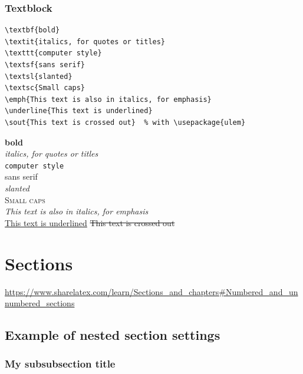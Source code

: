 \documentclass{article}
\begin{document}
\subsubsection{Textblock}
\begin{minipage}[t]{0.5\textwidth}
\begin{lstlisting}
\textbf{bold}
\textit{italics, for quotes or titles}
\texttt{computer style}
\textsf{sans serif}
\textsl{slanted}
\textsc{Small caps}
\emph{This text is also in italics, for emphasis}
\underline{This text is underlined}
\sout{This text is crossed out}  % with \usepackage{ulem}
\end{lstlisting}
\end{minipage}
\begin{minipage}[t]{0.5\textwidth}
\textbf{bold}\\
\textit{italics, for quotes or titles}\\
\texttt{computer style}\\
\textsf{sans serif}\\
\textsl{slanted}\\
\textsc{Small caps}\\
\emph{This text is also in italics, for emphasis}\\
\underline{This text is underlined}
\sout{This text is crossed out}
\end{minipage}

\newpage
\section{Sections}
\begin{minipage}{\textwidth}
\url{https://www.sharelatex.com/learn/Sections_and_chapters#Numbered_and_unnumbered_sections}
\end{minipage}

\lipsum[1]
\subsection{Example of nested section settings}
\lipsum[2]
\subsubsection{My subsubsection title}
\lipsum[3]
\end{document}

